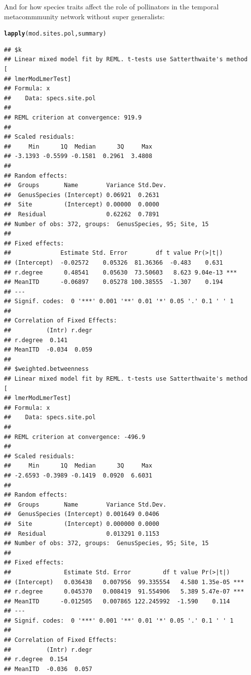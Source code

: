 \documentclass{article}\usepackage[]{graphicx}\usepackage[]{color}
\makeatletter
\newcommand{\hlstd}[1]{\textcolor[rgb]{0.345,0.345,0.345}{#1}}%
\newcommand{\hlkwd}[1]{\textcolor[rgb]{0.737,0.353,0.396}{\textbf{#1}}}%
\newenvironment{kframe}{%
 \def\at@end@of@kframe{}%
 \ifinner\ifhmode%
  \def\at@end@of@kframe{\end{minipage}}%
  \begin{minipage}{\columnwidth}%
 \fi\fi%
 \def\FrameCommand##1{\hskip\@totalleftmargin \hskip-\fboxsep
 \colorbox{shadecolor}{##1}\hskip-\fboxsep
     \hskip-\linewidth \hskip-\@totalleftmargin \hskip\columnwidth}%
 \MakeFramed {\advance\hsize-\width
   \@totalleftmargin\z@ \linewidth\hsize
   \@setminipage}}%
 {\par\unskip\endMakeFramed%
 \at@end@of@kframe}
\newenvironment{knitrout}{}{} %
\makeatother
\begin{document}
And for how species traits affect the role of pollinators in
the temporal metacommmunity network without super generalists: 
\begin{knitrout}
\color{fgcolor}\begin{kframe}
\begin{alltt}
\hlkwd{lapply}\hlstd{(mod.sites.pol, summary)}
\end{alltt}
\begin{verbatim}
## $k
## Linear mixed model fit by REML. t-tests use Satterthwaite's method [
## lmerModLmerTest]
## Formula: x
##    Data: specs.site.pol
## 
## REML criterion at convergence: 919.9
## 
## Scaled residuals: 
##     Min      1Q  Median      3Q     Max 
## -3.1393 -0.5599 -0.1581  0.2961  3.4808 
## 
## Random effects:
##  Groups       Name        Variance Std.Dev.
##  GenusSpecies (Intercept) 0.06921  0.2631  
##  Site         (Intercept) 0.00000  0.0000  
##  Residual                 0.62262  0.7891  
## Number of obs: 372, groups:  GenusSpecies, 95; Site, 15
## 
## Fixed effects:
##              Estimate Std. Error        df t value Pr(>|t|)    
## (Intercept)  -0.02572    0.05326  81.36366  -0.483    0.631    
## r.degree      0.48541    0.05630  73.50603   8.623 9.04e-13 ***
## MeanITD      -0.06897    0.05278 100.38555  -1.307    0.194    
## ---
## Signif. codes:  0 '***' 0.001 '**' 0.01 '*' 0.05 '.' 0.1 ' ' 1
## 
## Correlation of Fixed Effects:
##          (Intr) r.degr
## r.degree  0.141       
## MeanITD  -0.034  0.059
## 
## $weighted.betweenness
## Linear mixed model fit by REML. t-tests use Satterthwaite's method [
## lmerModLmerTest]
## Formula: x
##    Data: specs.site.pol
## 
## REML criterion at convergence: -496.9
## 
## Scaled residuals: 
##     Min      1Q  Median      3Q     Max 
## -2.6593 -0.3989 -0.1419  0.0920  6.6031 
## 
## Random effects:
##  Groups       Name        Variance Std.Dev.
##  GenusSpecies (Intercept) 0.001649 0.0406  
##  Site         (Intercept) 0.000000 0.0000  
##  Residual                 0.013291 0.1153  
## Number of obs: 372, groups:  GenusSpecies, 95; Site, 15
## 
## Fixed effects:
##               Estimate Std. Error         df t value Pr(>|t|)    
## (Intercept)   0.036438   0.007956  99.335554   4.580 1.35e-05 ***
## r.degree      0.045370   0.008419  91.554906   5.389 5.47e-07 ***
## MeanITD      -0.012505   0.007865 122.245992  -1.590    0.114    
## ---
## Signif. codes:  0 '***' 0.001 '**' 0.01 '*' 0.05 '.' 0.1 ' ' 1
## 
## Correlation of Fixed Effects:
##          (Intr) r.degr
## r.degree  0.154       
## MeanITD  -0.036  0.057
\end{verbatim}
\end{kframe}
\end{knitrout}
\clearpage
\end{document}
